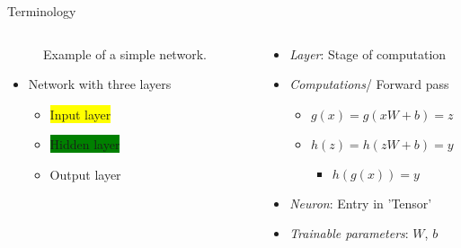 \documentclass[usenames,dvipsnames,Nike,mathserif]{tuberlinbeamer}
\begin{document}
\begin{frame}[fragile]{Terminology}
	\begin{columns}
		\begin{column}{.5\textwidth}
			\begin{figure}
				
				\caption{Example of a simple network.}
			\end{figure}
			\begin{itemize}
				\item<1-> Network with three layers
				\begin{itemize}
					\item<2->\colorbox{yellow}{Input layer}
					\item<2-> \colorbox{green}{Hidden layer}
					\item<2-> \colorbox{BlueGreen}{Output layer}
				\end{itemize}
			\end{itemize}
		\end{column}
		\begin{column}{.5\textwidth}
			\begin{itemize}
				\item<3->\emph{Layer}: Stage of computation
				\item<4->\emph{Computations}/ Forward pass
				\begin{itemize}
					\item $g(x)=g(xW+b)=z$
					\item $h(z)=h(zW+b)=y$
					\begin{itemize}
						\item $h(g(x))=y$
					\end{itemize}
				\end{itemize}
				\item<5->\emph{Neuron}: Entry in 'Tensor'
				\item<6->\emph{Trainable parameters}: $W$, $b$
			\end{itemize}
		\end{column}
	\end{columns}
\end{frame}
\end{document}
